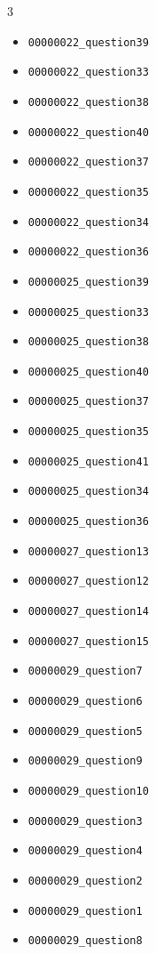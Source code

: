 \begin{multicols}{3}
\begin{itemize}[nosep, leftmargin=*]
        

        \item \texttt{00000022\_question39}
        \item \texttt{00000022\_question33}
        \item \texttt{00000022\_question38}
        \item \texttt{00000022\_question40}
        \item \texttt{00000022\_question37}
        \item \texttt{00000022\_question35}
        \item \texttt{00000022\_question34}
        \item \texttt{00000022\_question36}
        
        

        \item \texttt{00000025\_question39}
        \item \texttt{00000025\_question33}
        \item \texttt{00000025\_question38}
        \item \texttt{00000025\_question40}
        \item \texttt{00000025\_question37}
        \item \texttt{00000025\_question35}
        \item \texttt{00000025\_question41}
        \item \texttt{00000025\_question34}
        \item \texttt{00000025\_question36}
        
        

        \item \texttt{00000027\_question13}
        \item \texttt{00000027\_question12}
        \item \texttt{00000027\_question14}
        \item \texttt{00000027\_question15}
        
        

        \item \texttt{00000029\_question7}
        \item \texttt{00000029\_question6}
        \item \texttt{00000029\_question5}
        \item \texttt{00000029\_question9}
        \item \texttt{00000029\_question10}
        \item \texttt{00000029\_question3}
        \item \texttt{00000029\_question4}
        \item \texttt{00000029\_question2}
        \item \texttt{00000029\_question1}
        \item \texttt{00000029\_question8}
        

\end{itemize}
\end{multicols}
